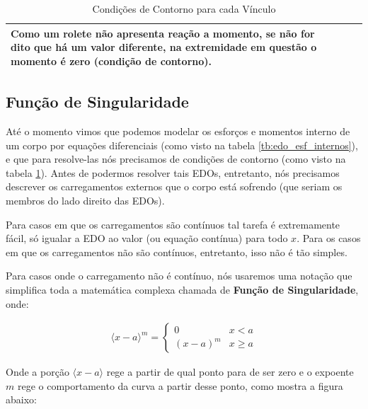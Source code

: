 \documentclass{article}
\begin{document}
\begin{table}[h]
\begin{tabular}{|l|c|l|}
        \begin{minipage}{.4\textwidth}
            \vspace{5px}
            Como um rolete não apresenta reação a momento, \textbf{se não for dito que há um valor diferente}, na extremidade em questão o momento é zero (condição de contorno).
        \end{minipage}               \\ \hline
    \end{tabular}
    \caption{Condições de Contorno para cada Vínculo}
    \label{tb:cond_contorno}
\end{table}

\newpage
\subsection{Função de Singularidade}
Até o momento vimos que podemos modelar os esforços e momentos interno de um corpo por equações diferenciais (como visto na tabela \ref{tb:edo_esf_internos}), e que para resolve-las
nós precisamos de condições de contorno (como visto na tabela \ref{tb:cond_contorno}). Antes de podermos resolver tais EDOs, entretanto, nós precisamos descrever os carregamentos
externos que o corpo está sofrendo (que seriam os membros do lado direito das EDOs).

Para casos em que os carregamentos são contínuos tal tarefa é extremamente fácil, só igualar a EDO ao valor (ou equação contínua) para todo $x$. Para os casos em que os carregamentos não são contínuos, entretanto, isso não é tão simples.

Para casos onde o carregamento não é contínuo, nós usaremos uma notação que simplifica toda a matemática complexa chamada de \textbf{Função de Singularidade}, onde:

\begin{align}
    \langle x - a\rangle^m = \begin{cases}
                                 0       & x<a     \\
                                 (x-a)^m & x \ge a
                             \end{cases}
    \label{eq:func_singularidade}
\end{align}

Onde a porção $\langle x - a \rangle$ rege a partir de qual ponto para de ser zero e o expoente $m$ rege o comportamento da curva a partir desse ponto, como mostra a figura abaixo:
\end{document}
